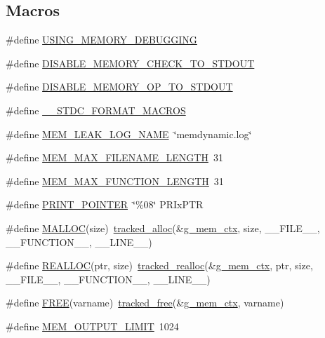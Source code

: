 \subsection*{Macros}
\begin{DoxyCompactItemize}
\item 
\#define \hyperlink{tracked__memory_8h_a57045b12fc465df47e223a6aa98f95f3}{U\-S\-I\-N\-G\-\_\-\-M\-E\-M\-O\-R\-Y\-\_\-\-D\-E\-B\-U\-G\-G\-I\-N\-G}
\item 
\#define \hyperlink{tracked__memory_8h_ab332d550e31ec677168b046e54f5d775}{D\-I\-S\-A\-B\-L\-E\-\_\-\-M\-E\-M\-O\-R\-Y\-\_\-\-C\-H\-E\-C\-K\-\_\-\-T\-O\-\_\-\-S\-T\-D\-O\-U\-T}
\item 
\#define \hyperlink{tracked__memory_8h_aa80cc71650d16e47bb40fa850083efc0}{D\-I\-S\-A\-B\-L\-E\-\_\-\-M\-E\-M\-O\-R\-Y\-\_\-\-O\-P\-\_\-\-T\-O\-\_\-\-S\-T\-D\-O\-U\-T}
\item 
\#define \hyperlink{tracked__memory_8h_aacbb9e1f38be71e22df1584a37c56693}{\-\_\-\-\_\-\-S\-T\-D\-C\-\_\-\-F\-O\-R\-M\-A\-T\-\_\-\-M\-A\-C\-R\-O\-S}
\item 
\#define \hyperlink{tracked__memory_8h_a4f16e38be32a4bbda23c530b11e19fb8}{M\-E\-M\-\_\-\-L\-E\-A\-K\-\_\-\-L\-O\-G\-\_\-\-N\-A\-M\-E}~\char`\"{}memdynamic.\-log\char`\"{}
\item 
\#define \hyperlink{tracked__memory_8h_ac811ed79333c5131bf74f609b0b67fcf}{M\-E\-M\-\_\-\-M\-A\-X\-\_\-\-F\-I\-L\-E\-N\-A\-M\-E\-\_\-\-L\-E\-N\-G\-T\-H}~31
\item 
\#define \hyperlink{tracked__memory_8h_af15f994b428f827c19ae31d1df47d7ca}{M\-E\-M\-\_\-\-M\-A\-X\-\_\-\-F\-U\-N\-C\-T\-I\-O\-N\-\_\-\-L\-E\-N\-G\-T\-H}~31
\item 
\#define \hyperlink{tracked__memory_8h_a8aa19886dfd5381ab173d9fcfec3e01d}{P\-R\-I\-N\-T\-\_\-\-P\-O\-I\-N\-T\-E\-R}~\char`\"{}\%08\char`\"{} P\-R\-Ix\-P\-T\-R
\item 
\#define \hyperlink{tracked__memory_8h_a3078f3c259e2a871314e3e0194896357}{M\-A\-L\-L\-O\-C}(size)~\hyperlink{tracked__memory_8h_a060364772083abaaf94eee077a5d3365}{tracked\-\_\-alloc}(\&\hyperlink{tracked__memory_8h_a7d7857f56a1eceeb304e53870738e18f}{g\-\_\-mem\-\_\-ctx}, size, \-\_\-\-\_\-\-F\-I\-L\-E\-\_\-\-\_\-, \-\_\-\-\_\-\-F\-U\-N\-C\-T\-I\-O\-N\-\_\-\-\_\-, \-\_\-\-\_\-\-L\-I\-N\-E\-\_\-\-\_\-)
\item 
\#define \hyperlink{tracked__memory_8h_a718b6446905826d711cb7ef00808bb4e}{R\-E\-A\-L\-L\-O\-C}(ptr, size)~\hyperlink{tracked__memory_8h_a4e46491d14d0a28b73e4758cc2b20d3b}{tracked\-\_\-realloc}(\&\hyperlink{tracked__memory_8h_a7d7857f56a1eceeb304e53870738e18f}{g\-\_\-mem\-\_\-ctx}, ptr, size, \-\_\-\-\_\-\-F\-I\-L\-E\-\_\-\-\_\-, \-\_\-\-\_\-\-F\-U\-N\-C\-T\-I\-O\-N\-\_\-\-\_\-, \-\_\-\-\_\-\-L\-I\-N\-E\-\_\-\-\_\-)
\item 
\#define \hyperlink{tracked__memory_8h_a89e21687efe425e8f99a4d0aac6f537c}{F\-R\-E\-E}(varname)~\hyperlink{tracked__memory_8h_adaadfc4aa30023606455c7f940868825}{tracked\-\_\-free}(\&\hyperlink{tracked__memory_8h_a7d7857f56a1eceeb304e53870738e18f}{g\-\_\-mem\-\_\-ctx}, varname)
\item 
\#define \hyperlink{tracked__memory_8h_aa041ffb2d12d9cd00022df58acb31c92}{M\-E\-M\-\_\-\-O\-U\-T\-P\-U\-T\-\_\-\-L\-I\-M\-I\-T}~1024
\end{DoxyCompactItemize}
